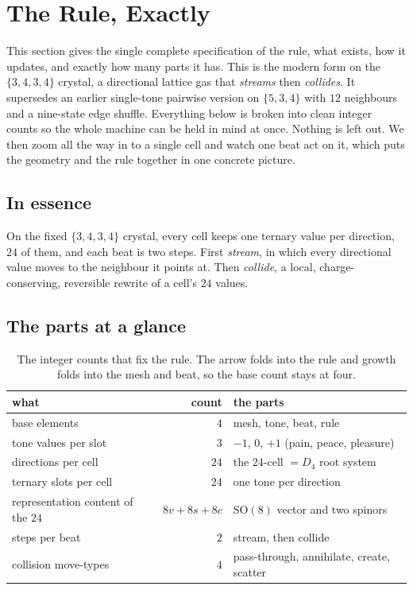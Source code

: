 \section{The Rule, Exactly}

This section gives the single complete specification of the rule, what exists, how it updates, and exactly how
many parts it has. This is the modern form on the $\{3,4,3,4\}$ crystal, a directional lattice gas that
\emph{streams} then \emph{collides}. It supersedes an earlier single-tone pairwise version on $\{5,3,4\}$ with
$12$ neighbours and a nine-state edge shuffle. Everything below is broken into clean integer counts so the whole
machine can be held in mind at once. Nothing is left out. We then zoom all the way in to a single cell and watch
one beat act on it, which puts the geometry and the rule together in one concrete picture.

\subsection{In essence}

On the fixed $\{3,4,3,4\}$ crystal, every cell keeps one ternary value per direction, $24$ of them, and each beat
is two steps. First \emph{stream}, in which every directional value moves to the neighbour it points at. Then
\emph{collide}, a local, charge-conserving, reversible rewrite of a cell's $24$ values.

\subsection{The parts at a glance}

\begin{table}[h]
\centering
\begin{tabular}{lrl}
\toprule
what & count & the parts \\
\midrule
base elements & $4$ & mesh, tone, beat, rule \\
tone values per slot & $3$ & $-1$, $0$, $+1$ (pain, peace, pleasure) \\
directions per cell & $24$ & the $24$-cell $= D_4$ root system \\
ternary slots per cell & $24$ & one tone per direction \\
representation content of the $24$ & $8v + 8s + 8c$ & $\mathrm{SO}(8)$ vector and two spinors \\
steps per beat & $2$ & stream, then collide \\
collision move-types & $4$ & pass-through, annihilate, create, scatter \\
\bottomrule
\end{tabular}
\caption{The integer counts that fix the rule. The arrow folds into the rule and growth folds into the mesh and
beat, so the base count stays at four.}
\end{table}


